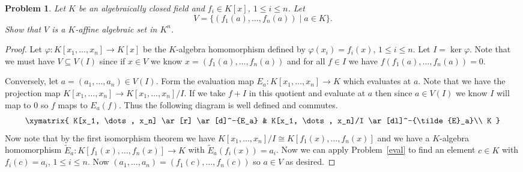 \documentclass{article}
\newtheorem{problem}{Problem}
\begin{document}
\begin{problem}
Let $K$ be an algebraically closed field and $f_i \in K[x]$, $1 \leq i \leq n$. Let
\[
V = \{(f_1(a), \dots , f_n(a)) \mid a \in K\}.
\]
Show that $V$ is a $K$-affine algebraic set in $K^n$.
\end{problem}
\begin{proof}
Let $\varphi : K[x_1, \dots , x_n] \to K[x]$ be the $K$-algebra homomorphism defined by $\varphi(x_i) = f_i(x)$, $1 \leq i \leq n$. Let $I = \ker \varphi$. Note that we must have $V \subseteq V(I)$ since if $x \in V$ we know $x = (f_1(a), \dots , f_n(a))$ and for all $f \in I$ we have $f(f_1(a), \dots , f_n(a)) = 0$.

Conversely, let $a = (a_1, \dots , a_n) \in V(I)$. Form the evaluation map $E_a : K[x_1, \dots , x_n] \to K$ which evaluates at $a$. Note that we have the projection map $K[x_1, \dots , x_n] \to K[x_1, \dots , x_n]/I$. If we take $f + I$ in this quotient and evaluate at $a$ then since $a \in V(I)$ we know $I$ will map to $0$ so $f$ maps to $E_a(f)$. Thus the following diagram is well defined and commutes.
\[
\xymatrix{
K[x_1, \dots , x_n] \ar[r] \ar[d]^-{E_a} & K[x_1, \dots , x_n]/I \ar[dl]^-{\tilde{E}_a}\\
K
}
\]
Now note that by the first isomorphism theorem we have $K[x_1, \dots , x_n]/I \cong K[f_1(x), \dots , f_n(x)]$ and we have a $K$-algebra homomorphism $\tilde{E}_a : K[f_1(x), \dots , f_n(x)] \to K$ with $\tilde{E}_a (f_i(x)) = a_i$. Now we can apply Problem~\ref{eval} to find an element $c \in K$ with $f_i(c) = a_i$, $1 \leq i \leq n$. Now $(a_1, \dots , a_n) = (f_1(c), \dots , f_n(c))$ so $a \in V$ as desired.
\end{proof}
\end{document}
